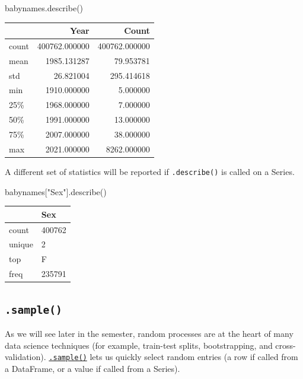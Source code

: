 \documentclass[
  letterpaper,
  DIV=11,
  numbers=noendperiod]{scrreprt}
\newenvironment{Shaded}{\begin{snugshade}}{\end{snugshade}}
\newcommand{\NormalTok}[1]{\textcolor[rgb]{0.00,0.23,0.31}{#1}}
\newcommand{\StringTok}[1]{\textcolor[rgb]{0.13,0.47,0.30}{#1}}
\begin{document}
\begin{Shaded}
\begin{Highlighting}[]
\NormalTok{babynames.describe()}
\end{Highlighting}
\end{Shaded}

\begin{tabular}{lrr}
\toprule
{} &           Year &          Count \\
\midrule
count &  400762.000000 &  400762.000000 \\
mean  &    1985.131287 &      79.953781 \\
std   &      26.821004 &     295.414618 \\
min   &    1910.000000 &       5.000000 \\
25\%   &    1968.000000 &       7.000000 \\
50\%   &    1991.000000 &      13.000000 \\
75\%   &    2007.000000 &      38.000000 \\
max   &    2021.000000 &    8262.000000 \\
\bottomrule
\end{tabular}

A different set of statistics will be reported if \texttt{.describe()}
is called on a Series.

\begin{Shaded}
\begin{Highlighting}[]
\NormalTok{babynames[}\StringTok{"Sex"}\NormalTok{].describe()}
\end{Highlighting}
\end{Shaded}

\begin{tabular}{ll}
\toprule
{} &     Sex \\
\midrule
count  &  400762 \\
unique &       2 \\
top    &       F \\
freq   &  235791 \\
\bottomrule
\end{tabular}

\hypertarget{sample}{%
\subsection{\texorpdfstring{\texttt{.sample()}}{.sample()}}\label{sample}}

As we will see later in the semester, random processes are at the heart
of many data science techniques (for example, train-test splits,
bootstrapping, and cross-validation).
\href{https://pandas.pydata.org/docs/reference/api/pandas.DataFrame.sample.html}{\texttt{.sample()}}
lets us quickly select random entries (a row if called from a DataFrame,
or a value if called from a Series).
\end{document}
